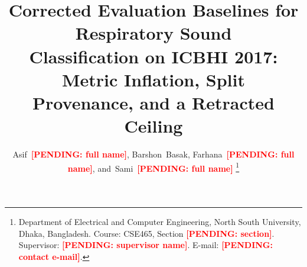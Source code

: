 \documentclass[journal,onecolumn]{IEEEtran}
\newcommand{\pending}[1]{\textcolor{red}{\textbf{[PENDING: #1]}}}
\begin{document}
\title{Corrected Evaluation Baselines for Respiratory Sound\\
Classification on ICBHI 2017: Metric Inflation, Split\\
Provenance, and a Retracted Ceiling}

\author{Asif~\pending{full name},
        Barshon~Basak,
        Farhana~\pending{full name},
        and~Sami~\pending{full name}%
\thanks{Department of Electrical and Computer Engineering, North South
University, Dhaka, Bangladesh. Course: CSE465, Section \pending{section}.
Supervisor: \pending{supervisor name}. E-mail: \pending{contact e-mail}.}}

\maketitle
\end{document}
